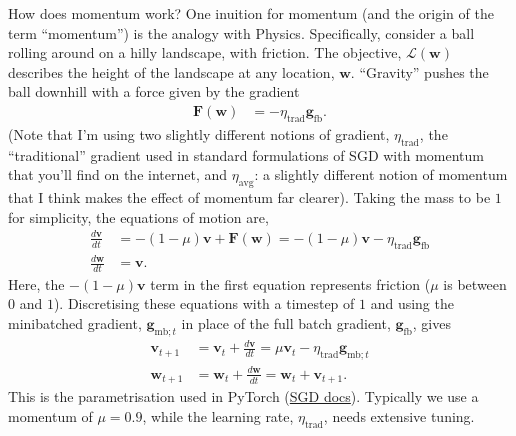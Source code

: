 \documentclass{article}
\newcommand{\dt}[2][]{\frac{d #1}{d #2}}
\newcommand{\0}{\mathbf{0}}
\newcommand{\g}{\mathbf{g}}
\newcommand{\mom}{\mathbf{v}}
\newcommand{\F}{\mathbf{F}}
\newcommand{\gfb}{\g_\text{fb}}
\newcommand{\gmbt}{\g_{\text{mb}; t}}
\newcommand{\w}{\mathbf{w}}
\renewcommand{\L}{\mathcal{L}}
\newcommand{\lrtrad}{\eta_\text{trad}}
\newcommand{\lravg}{\eta_\text{avg}}
\begin{document}
How does momentum work?
One inuition for momentum (and the origin of the term ``momentum'') is the analogy with Physics.
Specifically, consider a ball rolling around on a hilly landscape, with friction. 
The objective, $\L(\w)$ describes the height of the landscape at any location, $\w$.
``Gravity'' pushes the ball downhill with a force given by the gradient
\begin{align}
  \F(\w) &= - \lrtrad \gfb.
\end{align}
(Note that I'm using two slightly different notions of gradient, $\lrtrad$, the ``traditional'' gradient used in standard formulations of SGD with momentum that you'll find on the internet, and $\lravg$: a slightly different notion of momentum that I think makes the effect of momentum far clearer).
Taking the mass to be $1$ for simplicity, the equations of motion are,
\begin{subequations}
\begin{align}
  \dt[\mom]{t} &= - (1-\mu) \mom + \F(\w) = - (1-\mu) \mom - \lrtrad \gfb\\
  \dt[\w]{t} &= \mom.
\end{align}
\end{subequations}
Here, the $- (1-\mu) \mom$ term in the first equation represents friction ($\mu$ is between $0$ and $1$).
Discretising these equations with a timestep of $1$ and using the minibatched gradient, $\gmbt$ in place of the full batch gradient, $\gfb$, gives
\begin{subequations}
\begin{align}
  \label{eq:sgdm:trad:mom}
  \mom_{t+1} &= \mom_t + \dt[\mom]{t} = \mu \mom_t - \lrtrad \gmbt\\
  \label{eq:sgdm:trad:w}
  \w_{t+1} &= \w_t + \dt[\w]{t} = \w_{t} + \mom_{t+1}.
\end{align}
\end{subequations}
This is the parametrisation used in PyTorch (\href{https://pytorch.org/docs/stable/generated/torch.optim.SGD.html}{SGD docs}). Typically we use a momentum of $\mu=0.9$, while the learning rate, $\lrtrad$, needs extensive tuning.
\end{document}
